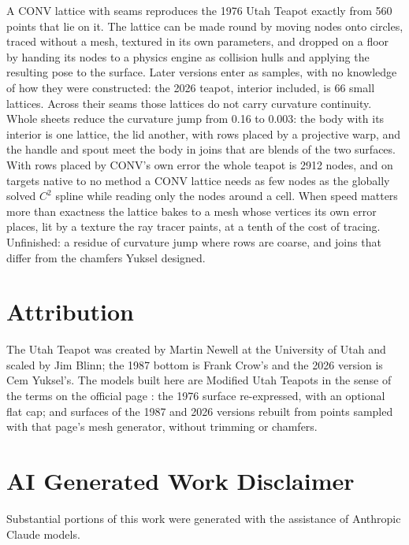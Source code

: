 \documentclass[journal]{IEEEtran}
\begin{document}
A CONV lattice with seams reproduces the 1976 Utah Teapot exactly from
560 points that lie on it. The lattice can be made
round by moving nodes onto circles, traced without a mesh, textured in
its own parameters, and dropped on a floor by handing its nodes to a
physics engine as collision hulls and applying the resulting pose to the
surface. Later versions enter as samples, with no knowledge of how
they were constructed: the 2026 teapot, interior included, is 66 small
lattices. Across their seams those lattices do not carry curvature
continuity. Whole sheets reduce the curvature jump from 0.16 to 0.003: the body with its interior is one
lattice, the lid another, with rows placed by a projective warp, and the
handle and spout meet the body in joins that are blends of the two
surfaces. With rows placed by CONV's own error the whole teapot is 2912
nodes, and on targets native to no method a CONV lattice needs as few
nodes as the globally solved $C^2$ spline while reading only the nodes
around a cell. When speed matters more than exactness the lattice bakes
to a mesh whose vertices its own error places, lit by a texture the ray
tracer paints, at a tenth of the cost of tracing. Unfinished: a residue
of curvature jump where rows are coarse, and
joins that differ from the chamfers Yuksel designed.

\section*{Attribution}

The Utah Teapot was created by Martin Newell at the University of Utah
and scaled by Jim Blinn; the 1987 bottom is Frank Crow's and the 2026
version is Cem Yuksel's. The models built here are Modified Utah Teapots
in the sense of the terms on the official page \cite{utahpage}: the 1976
surface re-expressed, with an optional flat cap; and surfaces of the 1987
and 2026 versions rebuilt from points sampled with that page's mesh
generator, without trimming or chamfers.

\section*{AI Generated Work Disclaimer}

Substantial portions of this work were generated with the assistance of
Anthropic Claude models.
\end{document}
